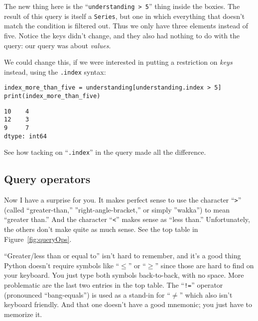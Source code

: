 The new thing here is the ``\texttt{understanding > 5}'' thing inside the
boxies. The result of this query is itself a \texttt{Series}, but one in which
everything that doesn't match the condition is filtered out. Thus we only have
three elements instead of five. Notice the keys didn't change, and they also
had nothing to do with the query: our query was about \textit{values}.


We could change this, if we were interested in putting a restriction on
\textit{keys} instead, using the \texttt{.index} syntax:

\begin{Verbatim}[fontsize=\footnotesize,samepage=true,frame=single,framesep=3mm]
index_more_than_five = understanding[understanding.index > 5]
print(index_more_than_five)
\end{Verbatim}

\begin{Verbatim}[fontsize=\small,samepage=true,frame=leftline,framesep=5mm,framerule=1mm]
10    4
12    3
9     7
dtype: int64
\end{Verbatim}

See how tacking on ``\texttt{.index}'' in the query made all the difference.

\subsection{Query operators}


Now I have a surprise for you. It makes perfect sense to use the character
``\texttt{>}'' (called ``greater-than,'' ''right-angle-bracket,'' or simply
''wakka'') to mean ``greater than.'' And the character ``\texttt{<}'' makes
sense as ``less than.'' Unfortunately, the others don't make quite as much
sense. See the top table in Figure~\ref{fig:queryOps}.


``Greater/less than or equal to'' isn't hard to remember, and it's a good thing
Python doesn't require symbols like ``$\le$'' or ``$\ge$'' since those are hard
to find on your keyboard. You just type both symbols back-to-back, with no
space. More problematic are the last two entries in the top table. The
``\texttt{!=}'' operator (pronounced ``bang-equals'') is used as a stand-in
for ``$\ne$'' which also isn't keyboard friendly. And that one doesn't have a
good mnemonic; you just have to memorize it.


